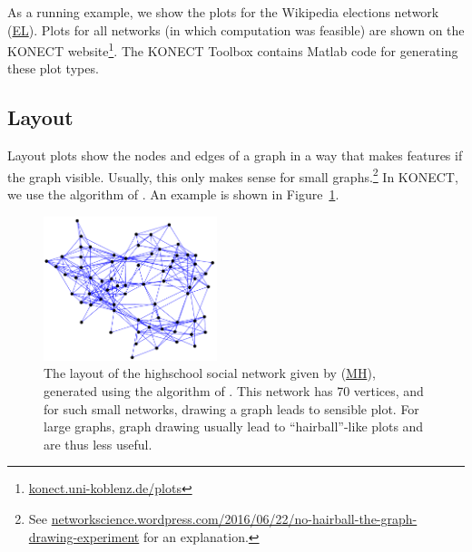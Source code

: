 \documentclass{article}
\newcommand{\wPlot}{0.45\textwidth}
\begin{document}
As a running example, we show the plots for the Wikipedia elections
network
(\href{http://konect.uni-koblenz.de/networks/elec}{\textsf{EL}}).  Plots
for all networks (in which computation was feasible) are shown on the
KONECT
website\footnote{\href{http://konect.uni-koblenz.de/plots/}{konect.uni-koblenz.de/plots}}. The
KONECT Toolbox contains Matlab code for generating these plot types.

\subsection{Layout}
Layout plots show the nodes and edges of a graph in a way that makes
features if the graph visible.  Usually, this only makes sense for small
graphs.\footnote{See
  \href{https://networkscience.wordpress.com/2016/06/22/no-hairball-the-graph-drawing-experiment/}{networkscience.wordpress.com/2016/06/22/no-hairball-the-graph-drawing-experiment}
  for an explanation.}
In KONECT, we use the algorithm of \cite{b870}.  An
example is shown in Figure~\ref{fig:fruchterman-reingold}.

\begin{figure}
  \centering
  \includegraphics[width=\wPlot]{plot/layout.a.moreno_highschool}
  \caption{
    \label{fig:fruchterman-reingold}
    The layout of the highschool social network given by \cite{konect:coleman}
    (\href{http://konect.uni-koblenz.de/networks/moreno_highschool}{\textsf{MH}}),
    generated using the algorithm of \cite{b870}.  This network has 70 vertices,
    and for such small networks, drawing a graph leads to sensible
    plot.  For large graphs, graph drawing usually lead to
    ``hairball''-like plots and are thus less useful.
  }
\end{figure}
\end{document}
